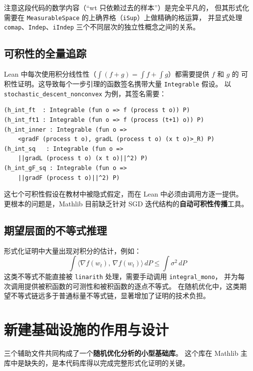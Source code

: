 \documentclass[12pt, a4paper]{article}
\newcommand{\ip}[2]{\langle #1,\, #2 \rangle}
\newcommand{\lean}[1]{\texttt{#1}}
\begin{document}
注意这段代码的数学内容（``wt 只依赖过去的样本''）是完全平凡的，
但其形式化需要在 \lean{MeasurableSpace} 的上确界格（\lean{iSup}）上做精确的格运算，
并显式处理 \lean{comap}、\lean{Indep}、\lean{iIndep} 三个不同层次的独立性概念之间的关系。

\subsection{可积性的全量追踪}

Lean 中每次使用积分线性性（$\int(f+g) = \int f + \int g$）都需要提供 $f$ 和 $g$ 的
可积性证明。这导致每个一步引理的函数签名携带大量 \lean{Integrable} 假设。
以 \lean{stochastic\_descent\_nonconvex} 为例，其签名需要：

\begin{lstlisting}
(h_int_ft  : Integrable (fun o => f (process t o)) P)
(h_int_ft1 : Integrable (fun o => f (process (t+1) o)) P)
(h_int_inner : Integrable (fun o =>
    <gradF (process t o), gradL (process t o) (x t o)>_R) P)
(h_int_sq   : Integrable (fun o =>
    ||gradL (process t o) (x t o)||^2) P)
(h_int_gF_sq : Integrable (fun o =>
    ||gradF (process t o)||^2) P)
\end{lstlisting}

这七个可积性假设在教材中被隐式假定，而在 Lean 中必须由调用方逐一提供。
更根本的问题是，Mathlib 目前缺乏针对 SGD 迭代结构的\textbf{自动可积性传播}工具。

\subsection{期望层面的不等式推理}

形式化证明中大量出现对积分的估计，例如：
\[
  \int \ip{\nabla f(w_t)}{\nabla f(w_t)}\, dP \leq \int \sigma^2\, dP
\]
这类不等式不能直接被 \lean{linarith} 处理，需要手动调用 \lean{integral\_mono}，
并为每次调用提供被积函数的可测性和被积函数的逐点不等式。
在随机优化中，这类期望不等式链远多于普通标量不等式链，显著增加了证明的技术负担。

\section{新建基础设施的作用与设计}

三个辅助文件共同构成了一个\textbf{随机优化分析的小型基础库}。
这个库在 Mathlib 主库中是缺失的，是本代码库得以完成完整形式化证明的关键。
\end{document}
